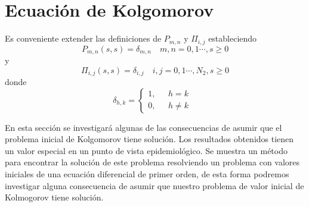 \section{Ecuación de Kolgomorov}
Es conveniente extender las definiciones de $P_{m,n}$ y $\Pi_{i,j}$ estableciendo $$P_{m,n}(s,s)=\delta_{m,n}\quad m,n=0,1\cdots, s\geq 0$$
y
$$\Pi_{i,j}(s,s)=\delta_{i,j}\quad i,j=0,1\cdots,N_2, s\geq 0$$
donde 
$$\delta_{h,k}=
    \begin{cases}
    1, & \mbox{ $h=k$ } \\
    0, & \mbox{ $h\not=k$}
    \end{cases}$$
\begin{comment}
    Usando la ecuación de Chapman-Kolgomorov se obtiene que
    $$P_{m,n}(s,t)=\sum_{k=0}^\infty P_{m,k}(s,u)P_{k,n}(u,t),$$
    $$\Pi_{i,j}(s,t)=\sum_{k=0}^{N_2} \Pi_{i,k}(s,u)\Pi_{k,j}(u,t),$$
\end{comment}

En esta sección se investigará algunas de las consecuencias de asumir que el problema inicial de Kolgomorov tiene solución. Los resultados obtenidos tienen un valor especial en un punto de vista epidemiológico. Se muestra un método para encontrar la solución de este problema resolviendo un problema con valores iniciales de una ecuación diferencial de primer orden, de esta forma podremos investigar alguna consecuencia de asumir que nuestro problema de valor inicial de Kolmogorov tiene solución.

